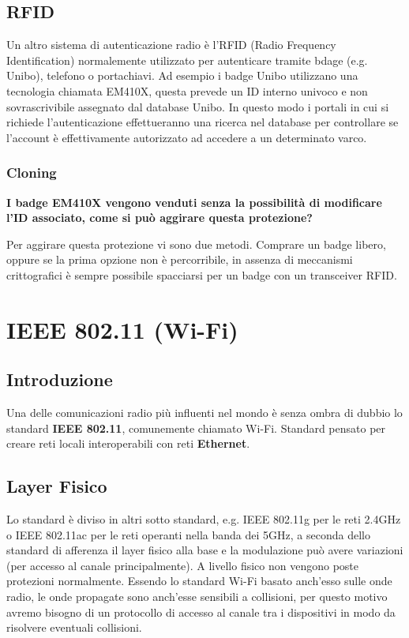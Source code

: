 \subsection{RFID}
Un altro sistema di autenticazione radio è l'RFID (Radio Frequency Identification) normalemente utilizzato per autenticare tramite bdage (e.g. Unibo), telefono o portachiavi.
Ad esempio i badge Unibo utilizzano una tecnologia chiamata EM410X, questa prevede un ID interno univoco e non sovrascrivibile assegnato dal database Unibo. In questo modo i portali in cui si richiede l'autenticazione effettueranno una ricerca nel database per controllare se l'account è effettivamente autorizzato ad accedere a un determinato varco.


\subsubsection{Cloning}
\textbf{I badge EM410X vengono venduti senza la possibilità di modificare l'ID associato, come si può aggirare questa protezione?}

Per aggirare questa protezione vi sono due metodi. Comprare un badge libero, oppure se la prima opzione non è percorribile, in assenza di meccanismi crittografici è sempre possibile spacciarsi per un badge con un transceiver RFID.

\section{IEEE 802.11 (Wi-Fi)}

\subsection{Introduzione}
Una delle comunicazioni radio più influenti nel mondo è senza ombra di dubbio lo standard \textbf{IEEE 802.11}, comunemente chiamato Wi-Fi.
Standard pensato per creare reti locali interoperabili con reti \textbf{Ethernet}.

\subsection{Layer Fisico}
Lo standard è diviso in altri sotto standard, e.g. IEEE 802.11g per le reti 2.4GHz o
IEEE 802.11ac per le reti operanti nella banda dei 5GHz, a seconda dello standard di afferenza il layer fisico alla base e la  modulazione può avere variazioni (per accesso al canale principalmente).
A livello fisico non vengono poste protezioni normalmente.
Essendo lo standard Wi-Fi basato anch'esso sulle onde radio, le onde propagate sono anch'esse sensibili a collisioni, per questo motivo avremo bisogno di un protocollo di accesso al canale tra i dispositivi in modo da risolvere eventuali collisioni.

